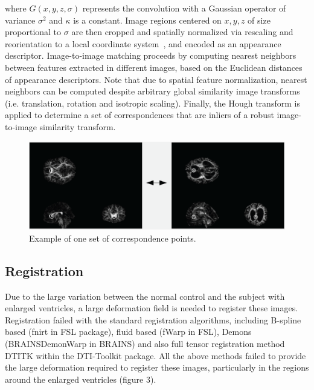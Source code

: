\documentclass[]{spie}  %
\begin{document}
where $G(x,y,z,\sigma)$ represents the convolution with a Gaussian operator of variance $\sigma^2$ and $\kappa$ is a constant. Image regions centered on $x,y,z$ of size proportional to $\sigma$ are then cropped and spatially normalized via rescaling and reorientation to a local coordinate system~\cite{Allaire:08}, and encoded as an appearance descriptor. Image-to-image matching proceeds by computing nearest neighbors between features extracted in different images, based on the Euclidean distances of appearance descriptors. Note that due to spatial feature normalization, nearest neighbors can be computed despite arbitrary global similarity image transforms (i.e. translation, rotation and isotropic scaling). Finally, the Hough transform is applied to determine a set of correspondences that are inliers of a robust image-to-image similarity transform.

\begin{figure}[htb]
\label{fig:Correspondence}
\includegraphics[width=1\columnwidth]{images/correspondence.png}
\centering
\caption{Example of one set of correspondence points.}
\end{figure}

\subsection{Registration}
Due to the large variation between the normal control and the subject with enlarged ventricles, a large deformation field is needed to register these images. Registration failed with the standard registration algorithms, including B-spline based (fnirt in FSL package), fluid based (fWarp in FSL), Demons (BRAINSDemonWarp in BRAINS) and also full tensor registration method DTITK within the DTI-Toolkit package. All the above methods failed to provide the large deformation required to register these images, particularly in the regions around the enlarged ventricles (figure 3).
\end{document}
